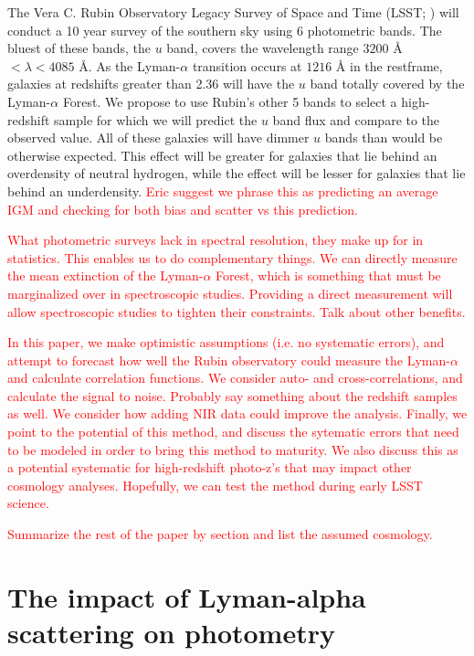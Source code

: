 \documentclass[twocolumn]{aastex631}
\newcommand{\note}[1]{\textsf{\textcolor{red}{#1}}\xspace}
\newcommand{\lya}{Lyman-$\alpha$\xspace}
\newcommand{\Ang}{\!\AA\xspace}
\begin{document}
The Vera C. Rubin Observatory Legacy Survey of Space and Time (LSST; \citealt{ivezic2019}) will conduct a 10 year survey of the southern sky using 6 photometric bands.
The bluest of these bands, the $u$ band, covers the wavelength range $3200$ \Ang $< \lambda < 4085$ \Ang.
As the \lya transition occurs at $1216$ \Ang in the restframe, galaxies at redshifts greater than 2.36 will have the $u$ band totally covered by the \lya Forest.
We propose to use Rubin's other 5 bands to select a high-redshift sample for which we will predict the $u$ band flux and compare to the observed value.
All of these galaxies will have dimmer $u$ bands than would be otherwise expected.
This effect will be greater for galaxies that lie behind an overdensity of neutral hydrogen, while the effect will be lesser for galaxies that lie behind an underdensity.
\note{Eric suggest we phrase this as predicting an average IGM and checking for both bias and scatter vs this prediction.}

\note{
    What photometric surveys lack in spectral resolution, they make up for in statistics.
    This enables us to do complementary things.
    We can directly measure the mean extinction of the \lya Forest, which is something that must be marginalized over in spectroscopic studies.
    Providing a direct measurement will allow spectroscopic studies to tighten their constraints.
    Talk about other benefits.
}

\note{
    In this paper, we make optimistic assumptions (i.e. no systematic errors), and attempt to forecast how well the Rubin observatory could measure the \lya and calculate correlation functions.
    We consider auto- and cross-correlations, and calculate the signal to noise.
    Probably say something about the redshift samples as well.
    We consider how adding NIR data could improve the analysis.
    Finally, we point to the potential of this method, and discuss the sytematic errors that need to be modeled in order to bring this method to maturity.
    We also discuss this as a potential systematic for high-redshift photo-z's that may impact other cosmology analyses.
    Hopefully, we can test the method during early LSST science.
}

\note{
    Summarize the rest of the paper by section and list the assumed cosmology.
}

\section{The impact of Lyman-alpha scattering on photometry}
\label{sec:decrements}
\end{document}
